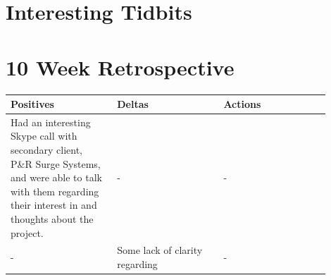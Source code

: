 \documentclass[onecolumn, draftclsnofoot,10pt, compsoc]{IEEEtran}
\begin{document}
    \section{Interesting Tidbits}
    
    \pagebreak
    \section{10 Week Retrospective}
    \vspace{.1in}
    \begin{center}
    \begin{tabular}{| p{0.3\linewidth}| p{0.3\linewidth}| p{0.3\linewidth}|}
    Positives & Deltas & Actions \\
    \hline
    {Had an interesting Skype call with secondary client, P\&R Surge Systems, and were able to talk with them regarding their interest in and thoughts about the project.} & - & - \\
    \hline
    - & {Some lack of clarity regarding } & - \\
    \hline
    \end{tabular}
    \end{center}

    
\end{document}

